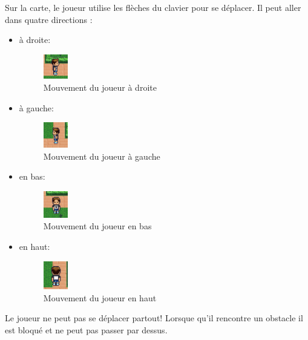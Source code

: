 Sur la carte, le joueur utilise les flèches du clavier pour se déplacer. Il peut aller dans quatre directions :

\begin{itemize}
    \item à droite:
          \begin{figure}[H]
              \centering
              \includegraphics[width=0.1\textwidth ]{images/movements/playerRight.png}
              \caption{Mouvement du joueur à droite}
              \label{fig:pic_dessus}
          \end{figure}

    \item à gauche:
          \begin{figure}[H]
              \centering
              \includegraphics[width=0.1\textwidth ]{images/movements/playerLeft.png}
              \caption{Mouvement du joueur à gauche}
              \label{fig:pic_dessus}
          \end{figure}

    \item en bas:
          \begin{figure}[H]
              \centering
              \includegraphics[width=0.1\textwidth ]{images/movements/playerDown.png}
              \caption{Mouvement du joueur en bas}
              \label{fig:pic_dessus}
          \end{figure}

    \item en haut:
          \begin{figure}[H]
              \centering
              \includegraphics[width=0.1\textwidth ]{images/movements/playerUp.png}
              \caption{Mouvement du joueur en haut}
              \label{fig:pic_dessus}
          \end{figure}
\end{itemize}


Le joueur ne peut pas se déplacer partout! Lorsque qu'il rencontre un obstacle il est bloqué et ne peut pas passer par dessus.
